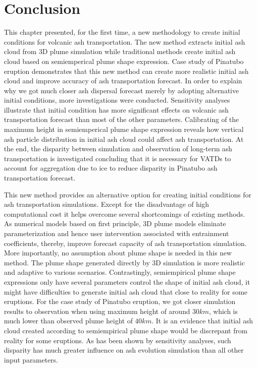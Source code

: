 \section{Conclusion}

This chapter presented, for the first time, a new methodology to create initial conditions for volcanic ash transportation. The new method extracts initial ash cloud from 3D plume simulation while traditional methods create initial ash cloud based on semiemperical plume shape expression. Case study of Pinatubo eruption demonstrates that this new method can create more realistic initial ash cloud and improve accuracy of ash transportation forecast. In order to explain why we got much closer ash dispersal forecast merely by adopting alternative initial conditions, more investigations were conducted. Sensitivity analyses illustrate that initial condition has more significant effects on volcanic ash transportation forecast than most of the other parameters. Calibrating of the maximum height in semiemperical plume shape expression reveals how vertical ash particle distribution in initial ash cloud could affect ash transportation. At the end, the disparity between simulation and observation of long-term ash transportation is investigated concluding that it is necessary for VATDs to account for aggregation due to ice to reduce disparity in Pinatubo ash transportation forecast.

This new method provides an alternative option for creating initial conditions for ash transportation simulations. Except for the disadvantage of high computational cost it helps overcome several shortcomings of existing methods.
As numerical models based on first principle, 3D plume models eliminate parameterization and hence user intervention associated with entrainment coefficients, thereby, improve forecast capacity of ash transportation simulation. More importantly, no assumption about plume shape is needed in this new method. The plume shape generated directly by 3D simulation is more realistic and adaptive to various scenarios.
Contrastingly, semiempirical plume shape expressions only have several parameters control the shape of initial ash cloud, it might have difficulties to generate initial ash cloud that close to reality for some eruptions.
For the case study of Pinatubo eruption, we got closer simulation results to observation when using maximum height of around $30 km$, which is much lower than observed plume height of $40 km$. It is an evidence that initial ash cloud created according to semiempirical plume shape would be discrepant from reality for some eruptions. As has been shown by sensitivity analyses, such disparity has much greater influence on ash evolution simulation than all other input parameters.

